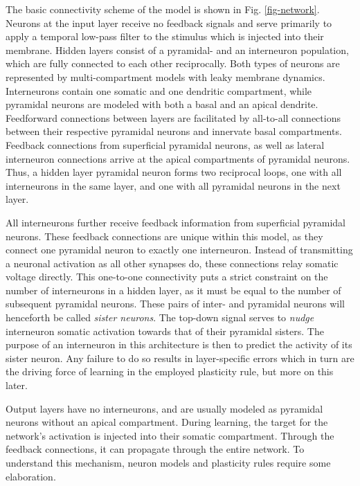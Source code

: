 
The basic connectivity scheme of the model is shown in Fig. \ref{fig-network}. Neurons at the input layer receive no
feedback signals and serve primarily to apply a temporal low-pass filter to the stimulus which is injected into their
membrane.  Hidden layers consist of a pyramidal- and an interneuron population, which are fully connected to each other
reciprocally. Both types of neurons are represented by multi-compartment models with leaky membrane dynamics.
Interneurons contain one somatic and one dendritic compartment, while pyramidal neurons are modeled with both a basal
and an apical dendrite.  Feedforward connections between layers are facilitated by all-to-all connections between their
respective pyramidal neurons and innervate basal compartments. Feedback connections from superficial pyramidal neurons,
as well as lateral interneuron connections arrive at the apical compartments of pyramidal neurons. Thus, a hidden layer
pyramidal neuron forms two reciprocal loops, one with all interneurons in the same layer, and one with all pyramidal
neurons in the next layer.

All interneurons further receive feedback information from superficial pyramidal neurons. These feedback connections are
unique within this model, as they connect one pyramidal neuron to exactly one interneuron. Instead of transmitting a
neuronal activation as all other synapses do, these connections relay somatic voltage directly. This one-to-one
connectivity puts a strict constraint on the number of interneurons in a hidden layer, as it must be equal to the number
of subsequent pyramidal neurons. These pairs of inter- and pyramidal neurons will henceforth be called \textit{sister
neurons}. The top-down signal serves to \textit{nudge} interneuron somatic activation towards that of their pyramidal
sisters. The purpose of an interneuron in this architecture is then to predict the activity of its sister neuron. Any
failure to do so results in layer-specific errors which in turn are the driving force of learning in the employed
plasticity rule, but more on this later.

Output layers have no interneurons, and are usually modeled as pyramidal neurons without an apical compartment. During
learning, the target for the network's activation is injected into their somatic compartment. Through the feedback
connections, it can propagate through the entire network. To understand this mechanism, neuron models and plasticity
rules require some elaboration.


